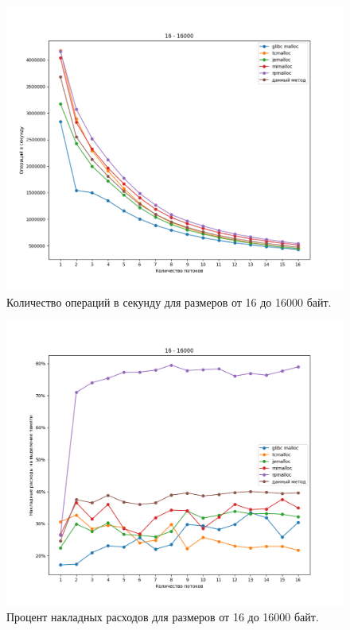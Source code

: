 \begin{figure}[!h]
	\begin{center}
		\includegraphics[width=1.0\linewidth, height=0.37\textheight]{images/16_16000_ops.png}
		\caption{Количество операций в секунду для размеров от 16 до 16000 байт.}
		\label{16_16000_ops}
	\end{center}
\end{figure}

\begin{figure}[!h]
	\begin{center}
		\includegraphics[width=1.0\linewidth, height=0.37\textheight]{images/16_16000_overhead.png}
		\caption{Процент накладных расходов для размеров от 16 до 16000 байт.}
		\label{16_16000_overhead}
	\end{center}
\end{figure}

